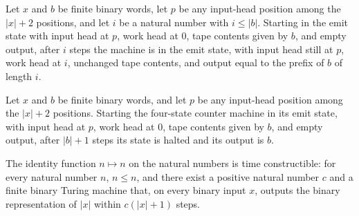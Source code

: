 \begin{lemma}
\label{Complexity.counter_emit_run}
\leanok
{}
Let $x$ and $b$ be finite binary words, let $p$ be any input-head position among the
$|x|+2$ positions, and let $i$ be a natural number with $i\le |b|$. Starting in the emit
state with input head at $p$, work head at $0$, tape contents given by $b$, and empty
output, after $i$ steps the machine is in the emit state, with input head still at $p$,
work head at $i$, unchanged tape contents, and output equal to the prefix of $b$ of
length $i$.
\end{lemma}

\begin{lemma}
\label{Complexity.counter_emit}
\leanok
{}
Let $x$ and $b$ be finite binary words, and let $p$ be any input-head position among the
$|x|+2$ positions. Starting the four-state counter machine in its emit state, with input
head at $p$, work head at $0$, tape contents given by $b$, and empty output, after
$|b|+1$ steps its state is halted and its output is $b$.
\end{lemma}

\begin{theorem}
\label{Complexity.timeConstructible_id}
\leanok
{}
The identity function $n\mapsto n$ on the natural numbers is time constructible: for
every natural number $n$, $n\le n$, and there exist a positive natural number $c$ and a
finite binary Turing machine that, on every binary input $x$, outputs the binary
representation of $|x|$ within $c(|x|+1)$ steps.
\end{theorem}

